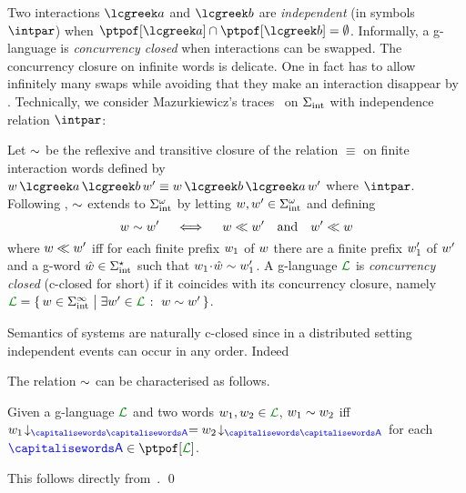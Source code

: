Two interactions $\aint$ and $\aint[b]$ are \emph{independent} (in
symbols $\intpar$)
when %
$\ptpof[\aint] \cap \ptpof[{\aint[b]}] = \emptyset$.
%
Informally, a g-language is \emph{concurrency closed} when
 interactions can be swapped.
%
The concurrency closure on infinite words is delicate.
%
One in fact has to allow infinitely many swaps while avoiding that
they make an interaction disappear by .
%
Technically, we consider Mazurkiewicz's traces~\cite{maz86} on
$\Sigma_{\text{int}}$ with independence relation $\intpar$:
\begin{definition}\label{def:cc}
  Let $\sim$ be the reflexive and transitive closure of the relation
  $\equiv$ on finite interaction words defined by
  $\acword\,\aint\,\aint[b]\,\acword' \equiv
  \acword\,\aint[b]\,\aint\,\acword'$ where $\intpar$.
  Following \emph{\cite[Def. 2.1]{Gastin90}}, $\sim$ extends to
  $\Sigma_{\text{int}}^\omega$ by letting $w,w'\in\Sigma_{\text{int}}^\omega$ and defining
  \[
	 w \sim w' \quad\iff\quad w \ll w' \quad\text{and}\quad w' \ll w
  \]
  where
  $w \ll w'$ iff for each finite prefix $w_1$ of
  $w$ there are a finite prefix $w_1'$ of $w'$ and a
  g-word $\hat {w} \in \Sigma_{\text{int}}^\star$ such that
  $w_1 \!\cdot\! \hat {w} \sim w_1'$.
  A g-language $\clang$ is \emph{concurrency closed} (c-closed for
  short) if it coincides with its concurrency closure, namely
  $\clang = \Set{\acword \in \alfint^\infty \sst \exists
	 \acword'\in\clang \qst \acword \comm \acword'}$.
\end{definition}

Semantics of systems are naturally c-closed since in a distributed setting
independent events can occur in any order.
%
Indeed
\begin{toappendix}
The relation $\sim$ can be characterised as follows.
  \begin{lemma}\label{lemma:equalProj}
  Given a g-language $\clang$ and two words
  $\acword_1, \acword_2 \in \clang$, $w_1 \sim w_2$ iff
  $\proj{\acword_1}{\p} = \proj{\acword_2}{\p}$ for each
  $\p \in \ptpof[\clang]$.
\end{lemma}
\end{toappendix}
\begin{appendixproof}
  This follows directly from~\cite[Proposition 2.2]{Gastin90}.
  \qed
\end{appendixproof}

